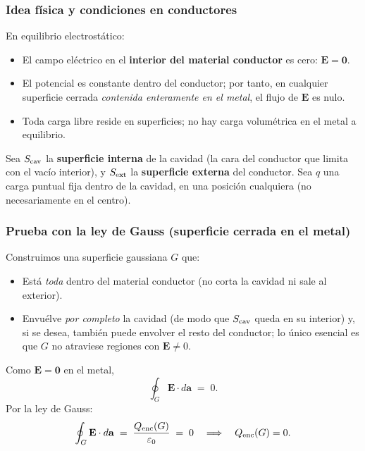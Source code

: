 \documentclass{article}
\begin{document}
\subsubsection*{Idea física y condiciones en conductores}
En equilibrio electrostático:
\begin{itemize}
\item El campo eléctrico en el \textbf{interior del material conductor} es cero: $\mathbf E=\mathbf 0$.
\item El potencial es constante dentro del conductor; por tanto, en cualquier superficie cerrada \emph{contenida enteramente en el metal}, el flujo de $\mathbf E$ es nulo.
\item Toda carga libre reside en superficies; no hay carga volumétrica en el metal a equilibrio.
\end{itemize}

Sea $S_{\rm cav}$ la \textbf{superficie interna} de la cavidad (la cara del conductor que limita con el vacío interior), y $S_{\rm ext}$ la \textbf{superficie externa} del conductor. Sea $q$ una carga puntual fija dentro de la cavidad, en una posición cualquiera (no necesariamente en el centro).

\subsubsection*{Prueba con la ley de Gauss (superficie cerrada en el metal)}
Construimos una superficie gaussiana $G$ que:
\begin{itemize}
  \item Está \emph{toda} dentro del material conductor (no corta la cavidad ni sale al exterior).
  \item Envuélve \emph{por completo} la cavidad (de modo que $S_{\rm cav}$ queda en su interior) y, si se desea, también puede envolver el resto del conductor; lo único esencial es que $G$ no atraviese regiones con $\mathbf E\neq 0$.
\end{itemize}
Como $\mathbf E=\mathbf 0$ en el metal,
\[
\oint_{G} \mathbf E\cdot d\mathbf a \;=\; 0.
\]
Por la ley de Gauss:
\[
\oint_{G} \mathbf E\cdot d\mathbf a \;=\; \frac{Q_{\rm enc}(G)}{\varepsilon_0} \;=\; 0
\quad\Longrightarrow\quad Q_{\rm enc}(G)=0.
\]
\end{document}
